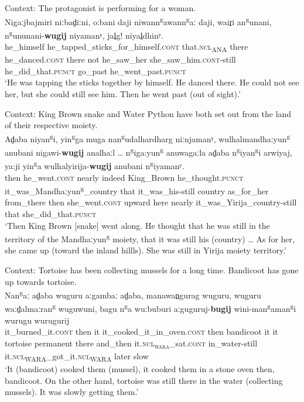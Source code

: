 \begin{exe}
	\ex\label{exAppendixWubuy1}
	 Context: The protagonist is performing for a woman.\\
	\gll Nigaːjbajmiri niːbad̠iːni, oːbani daji niwann\textsuperscript{g}awann\textsuperscript{g}aː daji, wair̠i an\textsuperscript{g}unani, n\textsuperscript{g}ununani-\textbf{wugij} niyamanʸ, jal̠g! niyal̠dhinʸ.\\
	he\_himself he\_tapped\_sticks\_for\_himself.\textsc{cont} that.\textsc{ncl}\textsubscript{ANA} there he\_danced.\textsc{cont} there not he\_saw\_her she\_saw\_him.\textsc{cont}-still he\_did\_that.\textsc{punct} go\_past he\_went\_past.\textsc{punct}\\
	\glt \lq He was tapping the sticks together by himself. He danced there. He could not see her, but she could still see him. Then he went past (out of sight).' \parencite[173–174]{Heath1980}
	
	\ex\label{exAppendixWubuy2}
	Context: King Brown snake and Water Python have both set out from the land of their respective moiety.\\
	\gll Ad̠aba niyan\textsuperscript{g}i, yin\textsuperscript{g}ga muga nan\textsuperscript{g}udalhardharg niːnjamanʸ, wulhalmandhaːyun\textsuperscript{g} anubani nigawi-\textbf{wugij} analhaːl … n\textsuperscript{g}iga:yun\textsuperscript{g} anuwagaːla ad̠aba n\textsuperscript{g}iyan\textsuperscript{g}i arwiyaj, ya:ji yin\textsuperscript{g}a wulhalyirija-\textbf{wugij} anubani n\textsuperscript{g}iyamanʸ.\\
	then he\_went.\textsc{cont} nearly indeed King\_Brown he\_thought.\textsc{punct} it\_was\_Mandhaːyun\textsuperscript{g}\_country that it\_was\_his-still country {} as\_for\_her from\_there then  she\_went.\textsc{cont} upward here nearly it\_was\_Yirija\_country-still that she\_did\_that.\textsc{punct}\\
	\glt \lq Then King Brown $[$snake$]$ went along. He thought that he was still in the territory of the Mandhaːyun\textsuperscript{g} moiety, that it was still his (country) … As for her, she came up (toward the inland hillls). She was still in Yirija moiety territory.' \parencite[150–151]{Heath1980}
	
	\ex\label{exAppendixWubuy3}
	Context: Tortoise has been collecting mussels for a long time. Bandicoot has gone up towards tortoise.\\
	\gll Nan\textsuperscript{g}aː ad̠aba wuguru aːgambaː ad̠aba, manawan̠gurag wuguru, wuguru waːd̠almaːran\textsuperscript{g} wuguwuni, bagu n\textsuperscript{g}a wuːbuburi aːguguruj-\textbf{bugij} wini-man\textsuperscript{g}aman\textsuperscript{g}i wurugu wurugurij\\
it\_burned\_it.\textsc{cont} then it it\_cooked\_it\_in\_oven.\textsc{cont} then bandicoot it it tortoise permanent there and\_then it.\textsc{ncl}\textsubscript{\textsc{wara}}\_sat.\textsc{cont} in\_water-still it.\textsc{ncl}\textsubscript{WARA}\_got\_it.\textsc{ncl}\textsubscript{WARA} later slow\\
\glt \lq It (bandicoot) cooked them (mussel), it cooked them in a stone oven then, bandicoot. On the other hand, tortoise was still there in the water (collecting mussels). It was slowly getting them.\rq{ }\parencite[202]{Heath1980} 


\end{exe}
